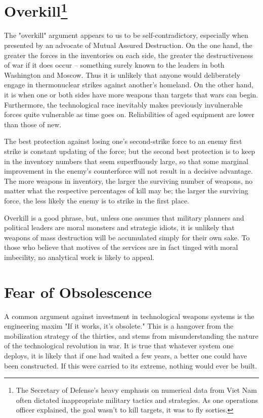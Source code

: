 \section{Overkill\footnote{The Secretary of Defense's heavy emphasis on numerical data from Viet Nam often dictated inappropriate military tactics and strategies. As one operations officer explained, the goal wasn't to kill targets, it was to fly sorties.}
}
The "overkill" argument appears to us to be self-contradictory, especially when presented by an advocate of Mutual Assured Destruction. On the one hand, the greater the forces in the inventories on each side, the greater the destructiveness of war if it does occur -- something surely known to the leaders in both Washington and Moscow. Thus it is unlikely that anyone would deliberately engage in thermonuclear strikes against another's homeland. On the other hand, it is when one or both sides have more weapons than targets that wars can begin. Furthermore, the technological race inevitably makes previously invulnerable forces quite vulnerable as time goes on. Reliabilities of aged equipment are lower than those of new.

The best protection against losing one's second-strike force to an enemy first strike is constant updating of the force; but the second best protection is to keep in the inventory numbers that seem superfluously large, so that some marginal improvement in the enemy's counterforce will not result in a decisive advantage. The more weapons in inventory, the larger the surviving number of weapons, no matter what the respective percentages of kill may be; the larger the surviving force, the less likely the enemy is to strike in the first place.

Overkill is a good phrase, but, unless one assumes that military planners and political leaders are moral monsters and strategic idiots, it is unlikely that weapons of mass destruction will be accumulated simply for their own sake. To those who believe that motives of the services are in fact tinged with moral imbecility, no analytical work is likely to appeal.

\section{Fear of Obsolescence}
A common argument against investment in technological weapons systems is the engineering maxim "If it works, it's obsolete." This is a hangover from the mobilization strategy of the thirties, and stems from misunderstanding the nature of the technological revolution in war. It is true that whatever system one deploys, it is likely that if one had waited a few years, a better one could have been constructed. If this were carried to its extreme, nothing would ever be built.

